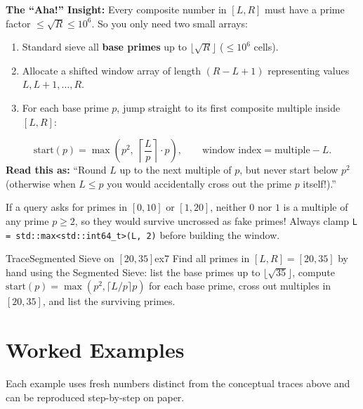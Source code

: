 \documentclass[11pt,a4paper]{article}
\theoremstyle{definition}
\newcommand{\ahabeat}{\textbf{\color{accentteal}The ``Aha!'' Insight:} }
\begin{document}
\ahabeat Every composite number in $[L, R]$ must have a prime factor $\le \sqrt{R} \le 10^6$. So you only need two small arrays:
\begin{enumerate}
    \item Standard sieve all \textbf{base primes} up to $\lfloor \sqrt{R} \rfloor$ ($\le 10^6$ cells).
    \item Allocate a shifted window array of length $(R - L + 1)$ representing values $L, L+1, \dots, R$.
    \item For each base prime $p$, jump straight to its first composite multiple inside $[L, R]$:
\end{enumerate}

\begin{formulabox}
\[
    \text{start}(p) = \max\!\left(p^2,\; \left\lceil \frac{L}{p} \right\rceil \cdot p\right),
    \qquad \text{window index} = \text{multiple} - L.
\]
\textbf{Read this as:} ``Round $L$ up to the next multiple of $p$, but never start below $p^2$ (otherwise when $L \le p$ you would accidentally cross out the prime $p$ itself!).''
\end{formulabox}

\begin{watchoutbox}
If a query asks for primes in $[0, 10]$ or $[1, 20]$, neither $0$ nor $1$ is a multiple of any prime $p \ge 2$, so they would survive uncrossed as fake primes! Always clamp \texttt{L = std::max<std::int64\_t>(L, 2)} before building the window.
\end{watchoutbox}

\begin{tryitbox}{Trace}{Segmented Sieve on $[20, 35]$}{ex7}
Find all primes in $[L, R] = [20, 35]$ by hand using the Segmented Sieve: list the base primes up to $\lfloor\sqrt{35}\rfloor$, compute $\text{start}(p) = \max(p^2, \lceil L/p \rceil p)$ for each base prime, cross out multiples in $[20, 35]$, and list the surviving primes.
\end{tryitbox}

\section{Worked Examples}

Each example uses fresh numbers distinct from the conceptual traces above and can be reproduced step-by-step on paper.
\end{document}
